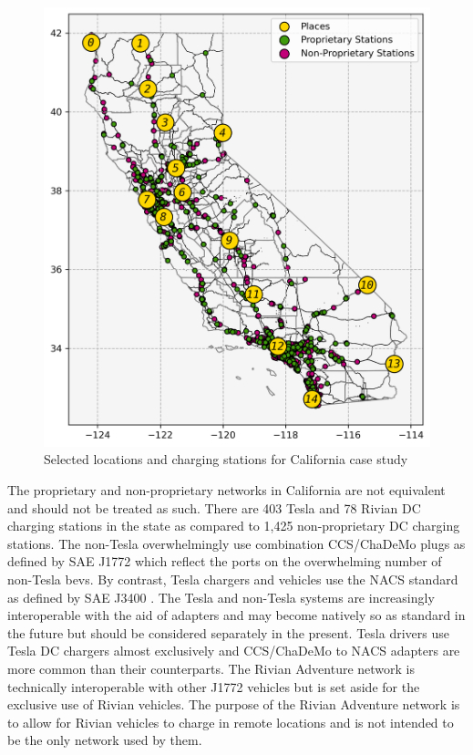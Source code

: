 \documentclass[11pt]{article}
\begin{document}
\begin{multicols}{2}
\begin{figure}[H]
	\centering
	\includegraphics[width = \linewidth]{figs/California_Places_Chargers.png}
	\caption{Selected locations and charging stations for California case study}
	\label{fig:california_atlas}
\end{figure}

The proprietary and non-proprietary networks in California are not equivalent and should not be treated as such. There are 403 Tesla and 78 Rivian DC charging stations in the state as compared to 1,425 non-proprietary DC charging stations. The non-Tesla overwhelmingly use combination CCS/ChaDeMo plugs as defined by SAE J1772 \cite{SAE_J1772} which reflect the ports on the overwhelming number of non-Tesla \glspl{bev}. By contrast, Tesla chargers and vehicles use the NACS standard as defined by SAE J3400 \cite{SAE_J3400}. The Tesla and non-Tesla systems are increasingly interoperable with the aid of adapters and may become natively so as standard in the future but should be considered separately in the present. Tesla drivers use Tesla DC chargers almost exclusively \cite{Visaria_2022} and CCS/ChaDeMo to NACS adapters are more common than their counterparts. The Rivian Adventure network is technically interoperable with other J1772 vehicles but is set aside for the exclusive use of Rivian vehicles. The purpose of the Rivian Adventure network is to allow for Rivian vehicles to charge in remote locations and is not intended to be the only network used by them.


\end{multicols}
\end{document}
